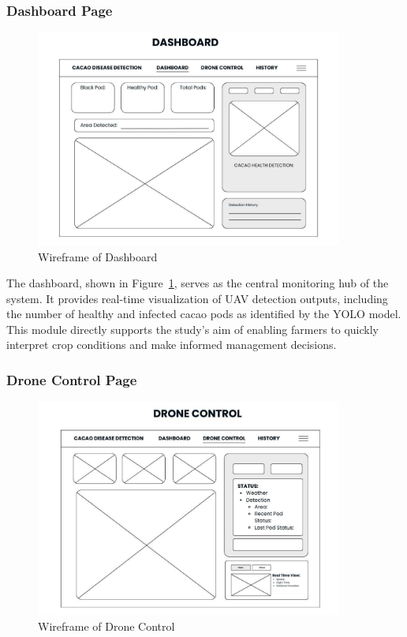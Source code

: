\subsubsection*{Dashboard Page}

\begin{figure}[H]
	\centering
	\caption{Wireframe of Dashboard}
	\label{fig:DashboardGUI}
	\includegraphics[width=0.9\textwidth]{figures/Dashboard.pdf}
\end{figure}

The dashboard, shown in Figure~\ref{fig:DashboardGUI}, serves as the central monitoring hub of the system. It provides real-time visualization of UAV detection outputs, including the number of healthy and infected cacao pods as identified by the YOLO model. This module directly supports the study’s aim of enabling farmers to quickly interpret crop conditions and make informed management decisions.

\subsubsection*{Drone Control Page}

\begin{figure}[H]
	\centering
	\caption{Wireframe of Drone Control}
	\label{fig:DroneControlGUI}
	\includegraphics[width=0.9\textwidth]{figures/Drone Control.pdf}
\end{figure}

